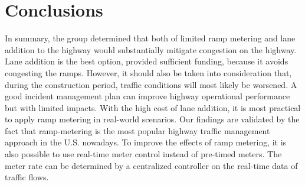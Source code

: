 \documentclass{article}
\begin{document}
\section{Conclusions}
In summary, the group determined that both of limited ramp metering and lane addition to the highway would substantially mitigate congestion on the highway. Lane addition is the best option, provided sufficient funding, because it avoids congesting the ramps. However, it should also be taken into consideration that, during the construction period, traffic conditions will most likely be worsened. A good incident management plan can improve highway operational performance but with limited impacts. With the high cost of lane addition, it is most practical to apply ramp metering in real-world scenarios. Our findings are validated by the fact that ramp-metering is the most popular highway traffic management approach in the U.S. nowadays. %
To improve the effects of ramp metering, it is also possible to use real-time meter control instead of pre-timed meters. The meter rate can be determined by a centralized controller on the real-time data of traffic flows.


\newpage




\newpage
\end{document}
